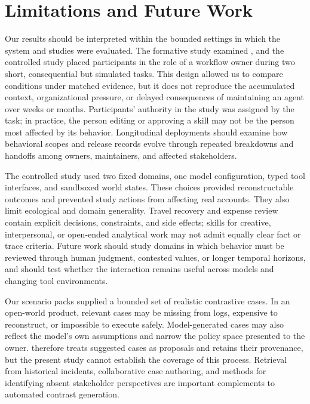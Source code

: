 \section{Limitations and Future Work}
\label{sec:limitations}

Our results should be interpreted within the bounded settings in which the
system and studies were evaluated. The formative study examined
, and the controlled study placed participants in the role of a
workflow owner during two short, consequential but simulated tasks. This
design allowed us to compare conditions under matched evidence, but it does
not reproduce the accumulated context, organizational pressure, or delayed
consequences of maintaining an agent over weeks or months. Participants'
authority in the study was assigned by the task; in practice, the person
editing or approving a skill may not be the person most affected by its
behavior. Longitudinal deployments should examine how behavioral scopes and
release records evolve through repeated breakdowns and handoffs among owners,
maintainers, and affected stakeholders.

The controlled study used two fixed domains, one model configuration, typed
tool interfaces, and sandboxed world states. These choices provided
reconstructable outcomes and prevented study actions from affecting real
accounts. They also limit ecological and domain generality. Travel recovery
and expense review contain explicit decisions, constraints, and side effects;
skills for creative, interpersonal, or open-ended analytical work may not
admit equally clear fact or trace criteria. Future work should study domains in
which behavior must be reviewed through human judgment, contested values, or
longer temporal horizons, and should test whether the interaction remains
useful across models and changing tool environments.

Our scenario packs supplied a bounded set of realistic contrastive cases. In
an open-world product, relevant cases may be missing from logs, expensive to
reconstruct, or impossible to execute safely. Model-generated cases may also
reflect the model's own assumptions and narrow the policy space presented to
the owner. \systemname{} therefore treats suggested cases as proposals and
retains their provenance, but the present study cannot establish the coverage
of this process. Retrieval from historical incidents, collaborative case
authoring, and methods for identifying absent stakeholder perspectives are
important complements to automated contrast generation.


